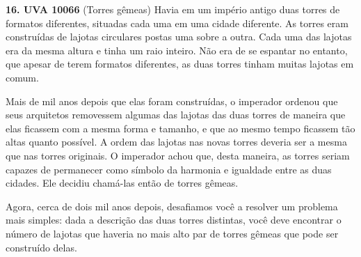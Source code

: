 
\noindent \textbf{16. UVA 10066} (Torres gêmeas) Havia em um império antigo duas torres de formatos diferentes, situadas cada uma em uma cidade diferente. As torres eram construídas de lajotas circulares postas uma sobre a outra. Cada uma das lajotas era da mesma altura e tinha um raio inteiro. Não era de se espantar no entanto, que apesar de terem formatos diferentes, as duas torres tinham muitas lajotas em comum.

Mais de mil anos depois que elas foram construídas, o imperador ordenou que seus arquitetos removessem algumas das lajotas das duas torres de maneira que elas ficassem com a mesma forma e tamanho, e que ao mesmo tempo ficassem tão altas quanto possível. A ordem das lajotas nas novas
torres deveria ser a mesma que nas torres originais. O imperador achou que, desta maneira, as torres seriam capazes de permanecer como símbolo da harmonia e igualdade entre as duas cidades. Ele decidiu chamá-las então de torres gêmeas.

Agora, cerca de dois mil anos depois, desafiamos você a resolver um problema mais simples: dada a descrição das duas torres distintas, você deve encontrar o número de lajotas que haveria no mais alto par de torres gêmeas que pode ser construído delas.\\[6pt]